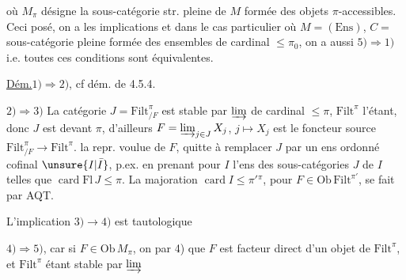 où $M_\pi$ désigne la sous-catégorie str. pleine de $M$ formée des objets $\pi$-accessibles.
Ceci posé, on a les implications
et dans le cas particulier où $M=(\mathrm{Ens})$, $C=$ sous-catégorie pleine formée des ensembles de cardinal $\leq\pi_0$, on a aussi $5)\Rightarrow1)$ i.e. toutes ces conditions sont équivalentes.

\uline{Dém.}\quad $1)\Rightarrow2)$, cf dém. de 4.5.4.

$2)\Rightarrow3)$ La catégorie $J=\mathrm{Filt}^{\pi}_{/F}$ est stable par $\varinjlim$ de cardinal $\leq\pi$, $\mathrm{Filt}^{\pi}$ l'étant, donc $J$ est  devant $\pi$, d'ailleurs $F=\varinjlim_{j\in J}X_j$,  $j\longmapsto X_j$ est le foncteur source $\mathrm{Filt}^{\pi}_{/F}\longrightarrow\mathrm{Filt}^{\pi}$.  la repr. voulue de $F$, quitte à remplacer $J$ par un ens ordonné cofinal $\unsure{I|\bar I}$, p.ex. en prenant pour $I$ l'ens des sous-catégories   $J$ de $I$   \deleted{$\leq\pi$} telles que $\operatorname{card}\mathrm{Fl}\,J\leq\pi$. La majoration $\operatorname{card}I\leq\pi'{}^\pi$, pour $F\in\mathrm{Ob}\,\mathrm{Filt}^{\pi'}$, se fait par AQT.

L'implication $3)\longrightarrow4)$ est tautologique

$4)\Rightarrow5)$, car si $F\in\mathrm{Ob}\,M_\pi$, on  par 4) que $F$ est facteur direct d'un objet de $\mathrm{Filt}^{\pi}$, et $\mathrm{Filt}^{\pi}$ étant stable par $\varinjlim$
